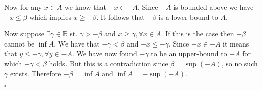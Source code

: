 \documentclass[11pt]{article}
\begin{document}
Now for any $x\in A$ we know that $-x \in -A$.
Since $-A$ is bounded above we have $-x \leq \beta$ which implies $x \geq -\beta$.
It follows that $-\beta$ is a lower-bound to $A$.

Now suppose $\exists \gamma \in \mathbb{R}$ st. $\gamma > -\beta$ and $x \geq \gamma, \forall x \in A$.
If this is the case then $-\beta$ cannot be $\inf{A}$.
We have that $-\gamma < \beta$ and $-x \leq -\gamma.$
Since $-x\in -A$ it means that $y \leq -\gamma, \forall y \in -A$.
We have now found $-\gamma$ to be an upper-bound to $-A$ for which $-\gamma < \beta$ holds.
But this is a contradiction since $\beta = \sup{(-A)}$, so no such $\gamma$ exists.
Therefore $-\beta = \inf{A}$ and $\inf{A} = -\sup{(-A)}$.

\hfill$\square$\\
\end{document}
